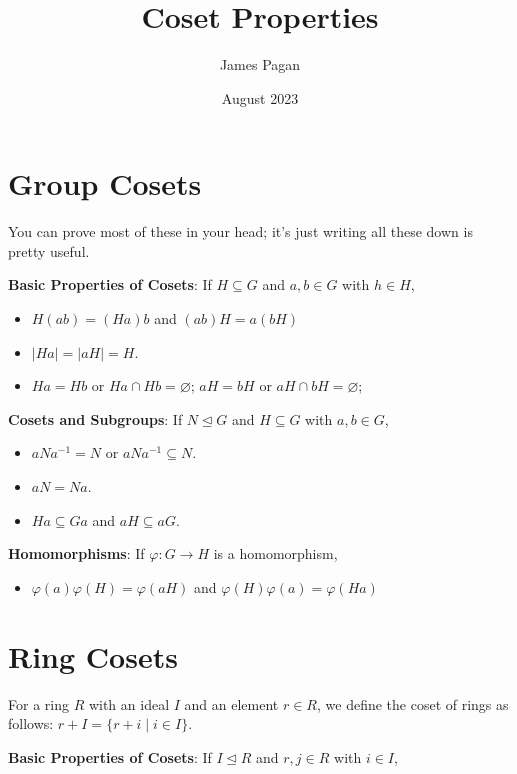 \documentclass[11pt]{article}
\title{Coset Properties}
\author{James Pagan}
\date{August 2023}
\begin{document}
\section{Group Cosets}

You can prove most of these in your head; it's just writing all these down is pretty useful.

\textbf{Basic Properties of Cosets}: If $H \subseteq G$ and $a, b \in G$ with $h \in H$,

\begin{itemize}

	\item $H(ab) = (Ha)b$ and $(ab)H = a(bH)$
	\item $|Ha| = |aH| = H$.
	\item $Ha = Hb$ or $Ha \cap Hb = \varnothing$; $aH = bH$ or $aH \cap bH = \varnothing$;

\end{itemize}

\textbf{Cosets and Subgroups}: If $N \trianglelefteq G$ and $H \subseteq G$ with $a, b \in G$,

\begin{itemize}

	\item $aNa^{-1} = N$ or $aNa^{-1} \subseteq N$.
	\item $aN = Na$.
	\item $Ha \subseteq Ga$ and $aH \subseteq aG$.

\end{itemize}

\textbf{Homomorphisms}: If $\varphi: G \rightarrow H$ is a homomorphism,

\begin{itemize}

	\item $\varphi(a)\varphi(H) = \varphi(aH)$ and $\varphi(H)\varphi(a) = \varphi(Ha)$

\end{itemize}

\newpage

\section{Ring Cosets}

For a ring $R$ with an ideal $I$ and an element $r \in R$, we define the coset of rings as follows: $r + I = \{ r + i \mid i \in I \}$.

\textbf{Basic Properties of Cosets}: If $I \trianglelefteq R$ and $r, j \in R$ with $i \in I$,
\end{document}
